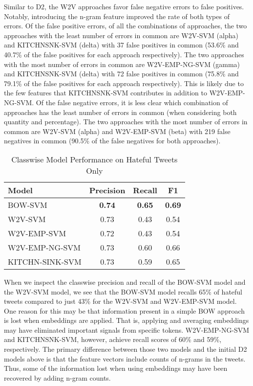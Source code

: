 \documentclass[11pt,a4paper]{article}
\begin{document}
Similar to D2, the W2V approaches favor false negative errors to false positives. Notably, introducing the n-gram feature improved the rate of both types of errors. Of the false positive errors, of all the combinations of approaches, the two approaches with the least number of errors in common are W2V-SVM (alpha) and KITCHNSNK-SVM (delta) with 37 false positives in common (53.6\% and 40.7\% of the false positives for each approach respectively). The two approaches with the most number of errors in common are W2V-EMP-NG-SVM (gamma) and KITCHNSNK-SVM (delta) with 72 false positives in common (75.8\% and 79.1\% of the false positives for each approach respectively). This is likely due to the few features that KITCHNSNK-SVM contributes in addition to W2V-EMP-NG-SVM. Of the false negative errors, it is less clear which combination of approaches has the least number of errors in common (when considering both quantity and percentage). The two approaches with the most number of errors in common are W2V-SVM (alpha) and W2V-EMP-SVM (beta) with 219 false negatives in common (90.5\% of the false negatives for both approaches).



\begin{table}[h]
\centering
\caption{Classwise Model Performance on Hateful Tweets Only}
\label{tab:model_performance}
\small
\begin{tabular}{lccc}
\hline
Model & Precision & Recall & F1 \\
\hline
BOW-SVM & \textbf{0.74} & \textbf{0.65} & \textbf{0.69} \\
W2V-SVM & 0.73 & 0.43 & 0.54 \\
W2V-EMP-SVM & 0.72 & 0.43 & 0.54 \\
W2V-EMP-NG-SVM & 0.73 & 0.60 & 0.66 \\
KITCHN-SINK-SVM & 0.73 & 0.59 & 0.65 \\
\hline
\end{tabular}
\end{table}

When we inspect the classwise precision and recall of the BOW-SVM model and the W2V-SVM model, we see that the BOW-SVM model recalls 65\% of hateful tweets compared to just 43\% for the W2V-SVM and W2V-EMP-SVM model. One reason for this may be that information present in a simple BOW approach is lost when embeddings are applied. That is, applying and averaging embeddings may have eliminated important signals from specific tokens. W2V-EMP-NG-SVM and KITCHNSNK-SVM, however, achieve recall scores of 60\% and 59\%, respectively. The primary difference between those two models and the initial D2 models above is that the feature vectors include counts of n-grams in the tweets. Thus, some of the information lost when using embeddings may have been recovered by adding n-gram counts.
\end{document}
